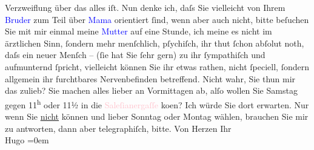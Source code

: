                Verzweiflung über das alles iſt.\pend
           \pstart
           Nun denke ich, daſs Sie vielleicht von Ihrem \textcolor{blue}{Bruder}{} zum Teil über \textcolor{blue}{Mama}{} orientiert ſind, wenn aber auch nicht, bitte {\pb}beſuchen Sie mit mir einmal meine
                  \textcolor{blue}{Mutter}{} auf eine Stunde, ich
               meine es nicht im ärztlichen Sinn, ſondern mehr menſchlich, pſychiſch, ihr thut ſchon
               abſolut noth, daſs ein neuer Menſch – (ſie hat Sie ſehr gern) zu ihr ſympathiſch und
               aufmunternd ſpricht, vielleicht können Sie ihr etwas rathen, nicht ſpeciell, ſondern
               allgemein ihr furchtbares Nervenbefinden betreffend.\pend
           \pstart
           Nicht wahr, Sie thun mir {\pb}das
               zulieb?\pend
           \pstart
           Sie machen alles lieber an Vormittagen ab, alſo wollen Sie Samstag gegen
                     11\textsuperscript{h} oder 11½ in die \textcolor{pink}{Saleſianergaſſe}{}\ledrightnote{\textcolor{pink}{Salesianergasse}}
                  ko{\geminationm}en?\pend
           \pstart
           Ich würde Sie dort erwarten. Nur wenn Sie \uline{nicht}
               können und lieber Sonntag oder Montag wählen, brauchen Sie
               mir zu antworten, dann {\pb}aber
               telegraphiſch, bitte.\pend
           \pstart
           Von Herzen Ihr{\\[\baselineskip]}\spacefill\mbox{Hugo}\pend
           \leftskip=0em{}\endnumbering{}  
      
